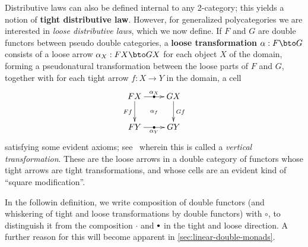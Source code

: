 \documentclass{amsart}
\let\tc\cdot
\newcommand{\bc}{\mathbin{\raisebox{1pt}{\scriptsize$\bullet$}}}
\let\oc\circ
\begin{document}
Distributive laws can also be defined internal to any 2-category; this yields a notion of \textbf{tight distributive law}.
However, for generalized polycategories we are interested in \emph{loose distributive laws}, which we now define.
If $F$ and $G$ are double functors between pseudo double categories, a \textbf{loose transformation} $\alpha:F\bto G$ consists of a loose arrow $\alpha_X : F X \bto G X$ for each object $X$ of the domain, forming a pseudonatural transformation between the loose parts of $F$ and $G$, together with for each tight arrow $f:X\to Y$ in the domain, a cell
\[ \xymatrix{ F X \ar[r]|-{\bullet}^-{\alpha_X} \ar[d]_{F f} \ar@{}[dr]|{\alpha_f} & G X \ar[d]^{G f} \\
F Y \ar[r]|-{\bullet}_-{\alpha_Y} & G Y} \]
satisfying some evident axioms; see~\cite{gp:something} wherein this is called a \emph{vertical transformation}.
These are the loose arrows in a double category of functors whose tight arrows are tight transformations, and whose cells are an evident kind of ``square modification''.

In the followin definition, we write composition of double functors (and whiskering of tight and loose transformations by double functors) with $\oc$, to distinguish it from the composition $\tc$ and $\bc$ in the tight and loose direction.
A further reason for this will become apparent in \cref{sec:linear-double-monads}.
\end{document}
